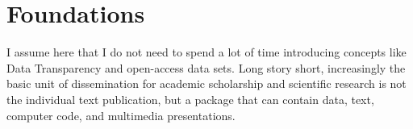 
\section{Foundations}\fbeg{}\begin{frame}{}

\begin{ftxt}

I assume here that I do not need to spend a lot of time 
introducing concepts like Data Transparency and 
open-access data sets.  Long story short, 
increasingly the basic unit of dissemination for 
academic scholarship and scientific research is not 
the individual text publication, but a package that 
can contain data, text, computer code, and 
multimedia presentations.  

\end{ftxt}

\end{frame}

